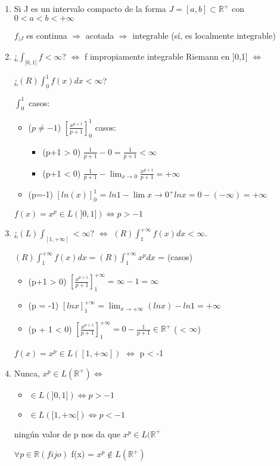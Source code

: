 \documentclass{article}
\begin{document}
\begin{enumerate}
\item Si J es un intervalo compacto de la forma $J=[a,b] \subset \mathbb{R}^+$ con $0<a<b<+\infty$ 

$f_{|J}$ es continua $\Rightarrow$ acotada $\Rightarrow$ integrable (sí, es localmente integrable)

\item ¿$\int_{]0,1]} f < \infty$? $\Leftrightarrow$ f impropiamente integrable Riemann en ]0,1] $\Leftrightarrow$ 

¿$(R)\int_0^1 f(x) dx < \infty$?

$\int_0^1$ casos:

\begin{itemize}
\item ($p\neq-1$) $[\frac{x^{p+1}}{p+1}]_0^1$ casos:
\begin{itemize}
\item (p+1 > 0) $\frac{1}{p+1} - 0= \frac{1}{p+1} < \infty$
\item (p+1 < 0) $\frac{1}{p+1} - \lim_{x \to 0} \frac{x^{p+1}}{p+1}=+\infty$
\end{itemize}

\item (p=-1) $[ln(x)]_0^1$ = $ln 1- \lim{x \to 0^+} lnx= 0 -(-\infty)= +\infty$
\end{itemize}

$f(x) = x^p \in L(]0,1]) \Leftrightarrow p > -1$

\item ¿$(L)\int_{[1,+\infty]} < \infty$? $\Leftrightarrow$ $(R)\int_1^{+\infty} f(x)dx < \infty$.

$(R)\int_1^{+\infty} f(x) dx= (R)\int_1^{+\infty} x^p dx$ = (casos)

\begin{itemize}
\item (p+1 > 0) $[\frac{x^{p+1}}{p+1}]_1^{+\infty} = \infty -1 = \infty$
\item (p = -1) $[ln x]_1^{+\infty} = \lim_{x\to +\infty} (ln x) - ln 1 = +\infty$
\item (p + 1 < 0) $[\frac{x^{p+1}}{p+1}]_1^{+\infty} = 0 - \frac{1}{p+1} \in \mathbb{R}^+$ ( < $\infty$)
\end{itemize}

$f(x) = x^p \in L([1,+\infty])$ $\Leftrightarrow$ p < -1

\item Nunca, $x^p \in L(\mathbb{R}^+) \Leftrightarrow$

\begin{itemize}
\item $\in L(]0,1]) \Leftrightarrow p > -1$
\item $\in L([1,+\infty[) \Leftrightarrow p < -1$
\end{itemize}

ningún valor de p nos da que $x^p \in L(\mathbb{R}^+$

$\forall p \in \mathbb{R} (fijo)$ f(x) = $x^p \notin L(\mathbb{R}^+)$
\end{enumerate}
\end{document}
